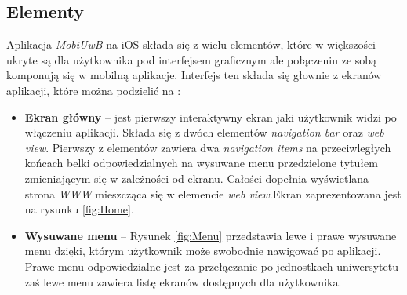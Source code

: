 \documentclass{iiuwb}
\begin{document}
\subsection{Elementy}
Aplikacja \textit{MobiUwB} na iOS składa się z wielu elementów, które w większości ukryte są dla użytkownika pod interfejsem graficznym ale połączeniu ze sobą komponują się w mobilną aplikacje. Interfejs ten składa się głownie z ekranów aplikacji, które można podzielić na :
\begin{itemize}
\item \textbf{Ekran główny} -- jest pierwszy interaktywny ekran jaki użytkownik widzi po włączeniu aplikacji. Składa się z dwóch elementów \textit{navigation bar} oraz \textit{web view}. Pierwszy z elementów zawiera dwa \textit{navigation items} na przeciwległych końcach belki odpowiedzialnych na wysuwane menu przedzielone tytułem zmieniającym się w zależności od ekranu. Całości dopełnia wyświetlana strona \textit{WWW} mieszcząca się w elemencie \textit{web view}.Ekran zaprezentowana jest na rysunku \ref{fig:Home}.
\item \textbf{Wysuwane menu} -- Rysunek \ref{fig:Menu} przedstawia lewe i prawe wysuwane menu dzięki, którym użytkownik może swobodnie nawigować po aplikacji. Prawe menu odpowiedzialne jest za przełączanie po jednostkach uniwersytetu zaś lewe menu zawiera listę ekranów dostępnych dla użytkownika.
\end{itemize}
\end{document}
